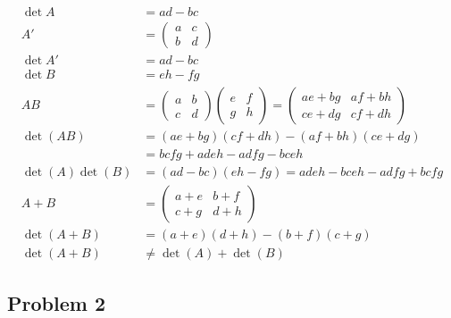 \documentclass[letterpaper, 11pt]{article}
\newcommand{\1}{\mathds{1}}	%
\theoremstyle{definition}
\begin{document}
\begin{align*}
    \det A &= ad-bc \\
    A' &= \begin{pmatrix}
        a & c \\
        b & d
    \end{pmatrix} \\
    \det A' &= ad-bc \\
    \det B &= eh-fg \\
    AB &= \begin{pmatrix}
        a & b \\
        c & d
    \end{pmatrix}\begin{pmatrix}
        e & f \\
        g & h
    \end{pmatrix} = \begin{pmatrix}
        ae+bg & af+bh \\
        ce+dg & cf+dh
    \end{pmatrix}\\
    \det (AB) &= (ae+bg)(cf+dh)- (af+bh)(ce+dg) \\
    &= bcfg + adeh - adfg - bceh \\
    \det (A) \det (B) &= (ad-bc)(eh-fg) = adeh - bceh - adfg + bcfg \\
    A + B &= \begin{pmatrix}
        a+e & b+f \\
        c+g & d+h
    \end{pmatrix}\\
    \det (A+B) &= (a+e)(d+h) - (b+f)(c+g) \\
    \det (A+B) &\neq \det (A) + \det (B)
\end{align*}

\subsection*{Problem 2}
\end{document}
